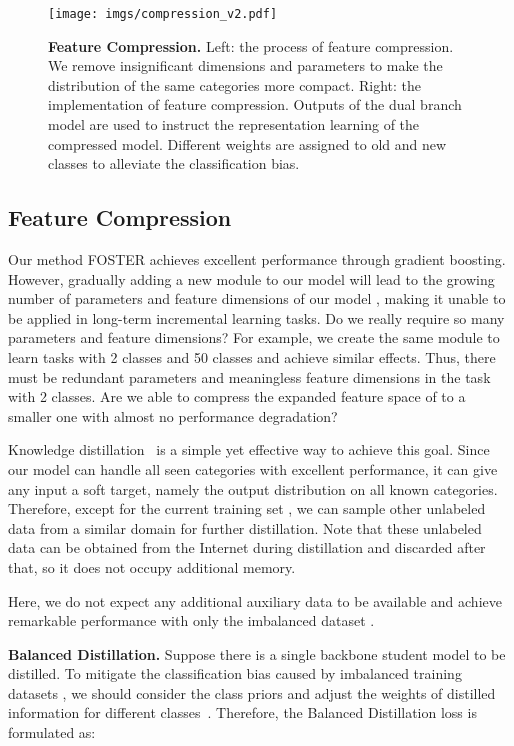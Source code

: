 \documentclass[runningheads]{llncs}
\begin{document}
\begin{figure}[t]
    \centering
    \texttt{[image: imgs/compression\_v2.pdf]}
    \caption{\small \textbf{Feature Compression.} Left: the process of feature compression. We remove insignificant dimensions and parameters to make the distribution of the same categories more compact. Right: the implementation of feature compression. Outputs of the dual branch model are used to instruct the representation learning of the compressed model. Different weights are assigned to old and new classes to alleviate the classification bias. }
    \label{fig:compression}
\end{figure}

\subsection{Feature Compression}\label{sec:compression}
Our method FOSTER achieves excellent performance through gradient boosting. However, gradually adding a new module  to our model  will lead to the growing number of parameters and feature dimensions of our model , making it unable to be applied in long-term incremental learning tasks. Do we really require so many parameters and feature dimensions? For example, we create the same module  to learn tasks with 2 classes and 50 classes and achieve similar effects. Thus, there must be redundant parameters and meaningless feature dimensions in the task with 2 classes. Are we able to compress the expanded feature space of  to a smaller one with almost no performance degradation? 
  
Knowledge distillation~\cite{KD} is a simple yet effective way to achieve this goal. Since our model  can handle all seen categories with excellent performance, it can give any input a soft target, namely the output distribution on all known categories. Therefore, except for the current training set , we can sample other unlabeled data from a similar domain for further distillation. Note that these unlabeled data can be obtained from the Internet during distillation and discarded after that, so it does not occupy additional memory. 

Here, we do not expect any additional auxiliary data to be available and achieve remarkable performance with only the imbalanced dataset .



\noindent\textbf{Balanced Distillation.}
Suppose there is a single backbone student model to be distilled.  To mitigate the classification bias caused by imbalanced training datasets ,  we should consider the class priors and adjust the weights of distilled information for different classes~\cite{zhang2021balanced}. Therefore, the Balanced Distillation loss is formulated as:
\end{document}
